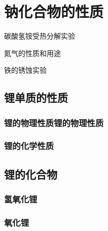 \documentclass[color=BLUE]{textbook-cn}%
\begin{document}
\begin{Exercise}
\begin{QsNum}
\item \lipsum[1][1-2]
\item \lipsum[1][1-2]
\item \lipsum[1][1-2]
\item \lipsum[1][1-2]
\item \lipsum[1][1-2]
\item \lipsum[1][1-2]
\item \lipsum[1][1-2]
\item \lipsum[1][1-2]
\end{QsNum}
\tcblower
\lipsum[1]
\end{Exercise}



\section{钠化合物的性质}
\begin{Point}
\lipsum[2]
\end{Point}

\begin{Case}
\item 碳酸氢铵受热分解实验
\item 氮气的性质和用途
\item 铁的锈蚀实验
\end{Case}


\subsection{锂单质的性质}
\subsubsection{锂的物理性质锂的物理性质}
\lipsum[1-2]
\subsubsection{锂的化学性质}
\lipsum[1-2]
\subsection{锂的化合物}
\lipsum[3]
\subsubsection{氢氧化锂}
\lipsum[1-2]
\subsubsection{氧化锂}
\lipsum[1-2]
\end{document}
